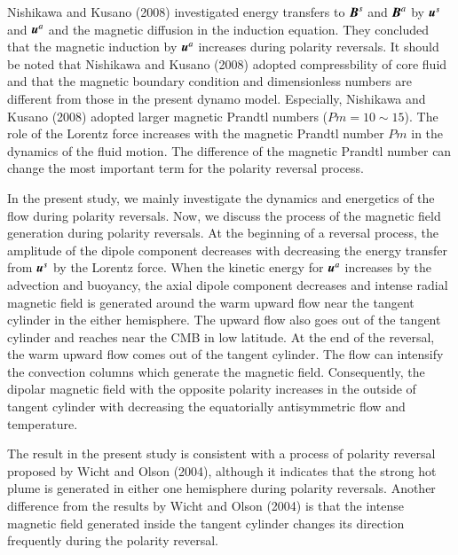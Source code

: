 {\color{red}
Nishikawa and Kusano (2008) %
investigated energy transfers to $\mbox{\boldmath$B$}^s$ and 
 $\mbox{\boldmath$B$}^a$ by $\mbox{\boldmath$u$}^s$ and 
 $\mbox{\boldmath$u$}^a$ and the magnetic diffusion in the induction equation.
}
They concluded that the magnetic induction by $\mbox{\boldmath$u$}^a$ increases during polarity reversals. 
{\color{red}
It should be noted that Nishikawa and Kusano (2008) adopted compressbility of core fluid and that the magnetic boundary condition and dimensionless numbers are different from those in the present dynamo model.
}
Especially, Nishikawa and Kusano (2008) adopted larger magnetic Prandtl numbers ($Pm = 10 \sim 15$). 
{\color{green}
The role of the Lorentz force increases with the magnetic Prandtl number $Pm$ in the dynamics of the fluid motion.
}
The difference of the magnetic Prandtl number can change the most important term for the polarity reversal process. 

{\color{green}
In the present study, we mainly investigate the dynamics and energetics of the flow during polarity reversals. 
Now, we discuss the process of the magnetic field generation during polarity reversals. 
At the beginning of a reversal process, the amplitude of the dipole component decreases with decreasing the energy transfer from $\mbox{\boldmath$u$}^s$ by the Lorentz force. 
When the kinetic energy for $\mbox{\boldmath$u$}^a$ increases by the advection and buoyancy, the axial dipole component decreases and intense radial magnetic field is generated around the warm upward flow near the tangent cylinder in the either hemisphere. 
The upward flow also goes out of the tangent cylinder and reaches near the CMB in low latitude. 
At the end of the reversal, the warm upward flow comes out of the tangent cylinder. 
The flow can intensify the convection columns which generate the magnetic field. 
Consequently, the dipolar magnetic field with the opposite polarity increases in the outside of tangent cylinder with decreasing the equatorially antisymmetric flow and temperature. 

The result in the present study is consistent with a process of polarity reversal proposed by Wicht and Olson (2004), %
although it indicates that the strong hot plume is generated in either one hemisphere during polarity reversals. Another difference from the results by Wicht and Olson (2004) is that the intense magnetic field generated inside the tangent cylinder changes its direction frequently during the polarity reversal.
}

